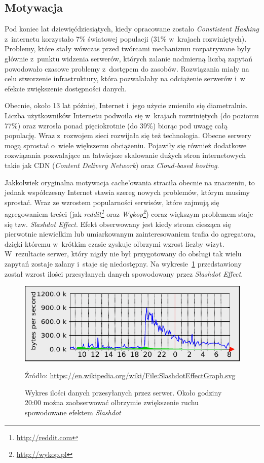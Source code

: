 \documentclass[a4paper,11pt]{scrartcl}
\newcommand{\figsource}[1]{
\captionsetup{font={scriptsize, it}}
\caption*{Źródło: \url{#1}}
\captionsetup{font={normalsize}}
}
\newcommand{\s}{ }
\newcommand{\keszowania}{cache'owania}
\begin{document}
\subsection{Motywacja}
Pod koniec lat dziewięćdziesiątych, kiedy opracowane zostało \textit{Constistent Hashing} z~internetu korzystało 7\% światowej populacji (31\% w~krajach rozwiniętych)\cite{wiki:GlobalStats}. Problemy, które stały wówczas przed twórcami mechanizmu rozpatrywane były głównie z~punktu widzenia serwerów, których zalanie nadmierną liczbą zapytań powodowało czasowe problemy z~dostępem do zasobów. Rozwiązania miały na celu stworzenie infrastruktury, która pozwalałaby na odciążenie serwerów i~w efekcie zwiększenie dostępności danych.

Obecnie, około 13 lat później, Internet i~jego użycie zmieniło się diametralnie. Liczba użytkowników Internetu podwoiła się w~krajach rozwiniętych (do poziomu 77\%) oraz wzrosła ponad pięciokrotnie (do 39\%) biorąc pod uwagę całą populację\cite{wiki:GlobalStats}. Wraz z~rozwojem sieci rozwijała się też technologia. Obecne serwery mogą sprostać o~wiele większemu obciążeniu. Pojawiły się również dodatkowe rozwiązania pozwalające na łatwiejsze skalowanie dużych stron internetowych takie jak CDN (\textit{Content Delivery Network}) oraz \textit{Cloud-based hosting}.

Jakkolwiek oryginalna motywacja \keszowania\s straciła obecnie na znaczeniu, to jednak współczesny Internet stawia szereg nowych problemów, którym musimy sprostać. Wraz ze wzrostem popularności serwisów, które zajmują się agregowaniem treści (jak \textit{reddit\footnote{\url{http://reddit.com}}} oraz \textit{Wykop\footnote{\url{http://wykop.pl}}}) coraz większym problemem staje się tzw. \textit{Slashdot Effect}. Efekt obserwowany jest kiedy strona ciesząca się pierwotnie niewielkim lub umiarkowanym zainteresowaniem trafia do agregatora, dzięki któremu w~krótkim czasie zyskuje olbrzymi wzrost liczby wizyt. W~rezultacie serwer, który nigdy nie był przygotowany do obsługi tak wielu zapytań zostaje zalany i~staje się niedostępny. Na wykresie~\ref{fig_slashdot} przedstawiony został wzrost ilości przesyłanych danych spowodowany przez \textit{Slashdot Effect}.

\begin{figure}[h!]
\centering
\includegraphics[width=0.9\linewidth]{img/SlashdotEffectGraph.pdf}
\figsource{https://en.wikipedia.org/wiki/File:SlashdotEffectGraph.svg}
\caption{Wykres ilości danych przesyłanych przez serwer. Około godziny 20:00 można zaobserwować olbrzymie zwiększenie ruchu spowodowane efektem \textit{Slashdot}}
\label{fig_slashdot}
\end{figure}
\end{document}
